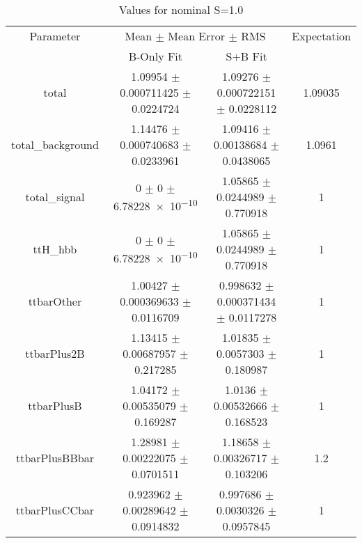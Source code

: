 \begin{table}
\centering
\caption{Values for nominal S=1.0}
\begin{tabular}{cccc}
\toprule
Parameter & \multicolumn{2}{c}{Mean $\pm$ Mean Error $\pm$ RMS} & Expectation\\
 & B-Only Fit & S+B Fit & \\
\midrule
total & \num{1.09954} $\pm$ \num{0.000711425} $\pm$ \num{0.0224724} & \num{1.09276} $\pm$ \num{0.000722151} $\pm$ \num{0.0228112} & \num{1.09035}\\
total\_background & \num{1.14476} $\pm$ \num{0.000740683} $\pm$ \num{0.0233961} & \num{1.09416} $\pm$ \num{0.00138684} $\pm$ \num{0.0438065} & \num{1.0961}\\
total\_signal & \num{0} $\pm$ \num{0} $\pm$ \num{6.78228e-10} & \num{1.05865} $\pm$ \num{0.0244989} $\pm$ \num{0.770918} & \num{1}\\
ttH\_hbb & \num{0} $\pm$ \num{0} $\pm$ \num{6.78228e-10} & \num{1.05865} $\pm$ \num{0.0244989} $\pm$ \num{0.770918} & \num{1}\\
ttbarOther & \num{1.00427} $\pm$ \num{0.000369633} $\pm$ \num{0.0116709} & \num{0.998632} $\pm$ \num{0.000371434} $\pm$ \num{0.0117278} & \num{1}\\
ttbarPlus2B & \num{1.13415} $\pm$ \num{0.00687957} $\pm$ \num{0.217285} & \num{1.01835} $\pm$ \num{0.0057303} $\pm$ \num{0.180987} & \num{1}\\
ttbarPlusB & \num{1.04172} $\pm$ \num{0.00535079} $\pm$ \num{0.169287} & \num{1.0136} $\pm$ \num{0.00532666} $\pm$ \num{0.168523} & \num{1}\\
ttbarPlusBBbar & \num{1.28981} $\pm$ \num{0.00222075} $\pm$ \num{0.0701511} & \num{1.18658} $\pm$ \num{0.00326717} $\pm$ \num{0.103206} & \num{1.2}\\
ttbarPlusCCbar & \num{0.923962} $\pm$ \num{0.00289642} $\pm$ \num{0.0914832} & \num{0.997686} $\pm$ \num{0.0030326} $\pm$ \num{0.0957845} & \num{1}\\
\bottomrule
\end{tabular}
\end{table}